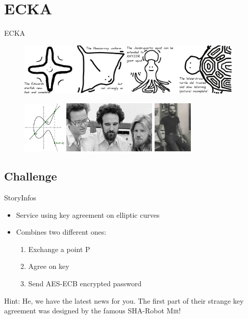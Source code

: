 \section{ECKA}
\begin{frame}{ECKA}
    \begin{figure}[!htb]
        \includegraphics[height=25mm]{data/ec-types.png}
    \end{figure}
    \begin{figure}[!htb]
        \includegraphics[height=25mm]{data/ec.png}\hspace{10mm}
        \includegraphics[height=25mm]{data/merkle-hellman-diffie.jpg}\hspace{10mm}
        \includegraphics[height=25mm]{data/shamir.jpg}
    \end{figure}
\end{frame}

\subsection{Challenge}
\begin{frame}{Story}{Infos}
    \begin{itemize}
        \item Service using key agreement on elliptic curves
        \item Combines two different ones: \begin{enumerate}
           \item Exchange a point P
           \item Agree on key
           \item Send AES-ECB encrypted password
        \end{enumerate}
    \end{itemize}
    Hint: He, we have the latest news for you.
    The first part of their strange key agreement
    was designed by the famous SHA-Robot \textsc{Mir}!
\end{frame}

